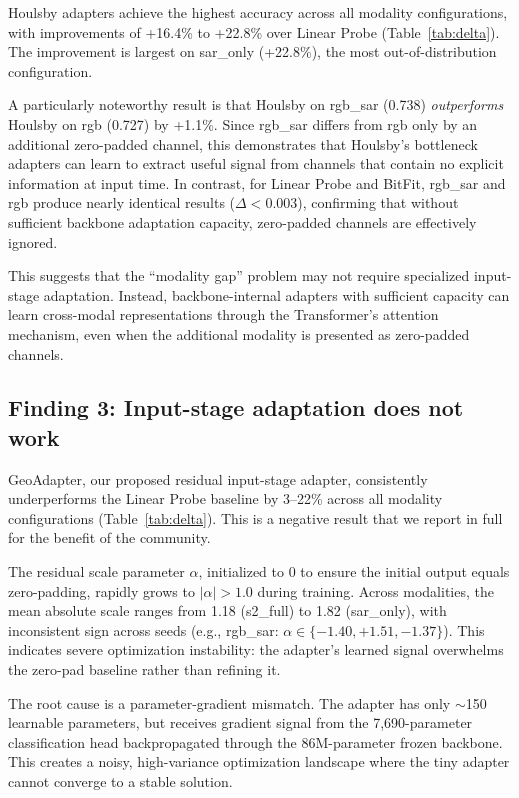 \documentclass{article}
\begin{document}
Houlsby adapters achieve the highest accuracy across all modality configurations, with improvements of +16.4\% to +22.8\% over Linear Probe (Table~\ref{tab:delta}). The improvement is largest on sar\_only (+22.8\%), the most out-of-distribution configuration.

A particularly noteworthy result is that Houlsby on rgb\_sar (0.738) \emph{outperforms} Houlsby on rgb (0.727) by +1.1\%. Since rgb\_sar differs from rgb only by an additional zero-padded channel, this demonstrates that Houlsby's bottleneck adapters can learn to extract useful signal from channels that contain no explicit information at input time. In contrast, for Linear Probe and BitFit, rgb\_sar and rgb produce nearly identical results ($\Delta < 0.003$), confirming that without sufficient backbone adaptation capacity, zero-padded channels are effectively ignored.

This suggests that the ``modality gap'' problem may not require specialized input-stage adaptation. Instead, backbone-internal adapters with sufficient capacity can learn cross-modal representations through the Transformer's attention mechanism, even when the additional modality is presented as zero-padded channels.

\subsection{Finding 3: Input-stage adaptation does not work}

GeoAdapter, our proposed residual input-stage adapter, consistently underperforms the Linear Probe baseline by 3--22\% across all modality configurations (Table~\ref{tab:delta}). This is a negative result that we report in full for the benefit of the community.

The residual scale parameter $\alpha$, initialized to 0 to ensure the initial output equals zero-padding, rapidly grows to $|\alpha| > 1.0$ during training. Across modalities, the mean absolute scale ranges from 1.18 (s2\_full) to 1.82 (sar\_only), with inconsistent sign across seeds (e.g., rgb\_sar: $\alpha \in \{-1.40, +1.51, -1.37\}$). This indicates severe optimization instability: the adapter's learned signal overwhelms the zero-pad baseline rather than refining it.

The root cause is a parameter-gradient mismatch. The adapter has only $\sim$150 learnable parameters, but receives gradient signal from the 7,690-parameter classification head backpropagated through the 86M-parameter frozen backbone. This creates a noisy, high-variance optimization landscape where the tiny adapter cannot converge to a stable solution.
\end{document}
